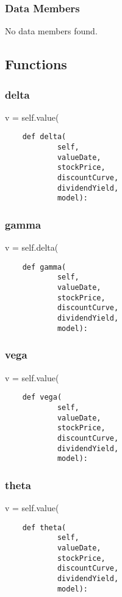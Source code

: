 \documentclass[twoside,11pt]{book}
\begin{document}
\subsubsection*{Data Members}
No data members found.

\subsection*{Functions}

\subsubsection*{{\bf delta}}
v = self.value( 

\begin{lstlisting}
    def delta(
            self,
            valueDate,
            stockPrice,
            discountCurve,
            dividendYield,
            model):
\end{lstlisting}

\subsubsection*{{\bf gamma}}
v = self.delta( 

\begin{lstlisting}
    def gamma(
            self,
            valueDate,
            stockPrice,
            discountCurve,
            dividendYield,
            model):
\end{lstlisting}

\subsubsection*{{\bf vega}}
v = self.value( 

\begin{lstlisting}
    def vega(
            self,
            valueDate,
            stockPrice,
            discountCurve,
            dividendYield,
            model):
\end{lstlisting}

\subsubsection*{{\bf theta}}
v = self.value( 

\begin{lstlisting}
    def theta(
            self,
            valueDate,
            stockPrice,
            discountCurve,
            dividendYield,
            model):
\end{lstlisting}
\end{document}
